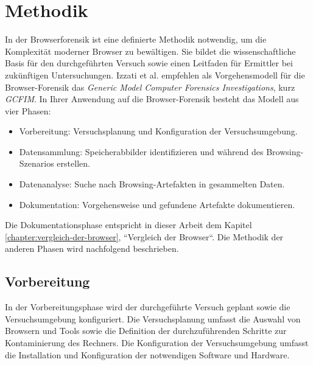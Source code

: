 \chapter{Methodik}
\label{chapter:methodik}
In der Browserforensik ist eine definierte Methodik notwendig, um die Komplexität moderner Browser zu bewältigen. Sie bildet die wissenschaftliche Basis für den durchgeführten Versuch sowie einen Leitfaden für Ermittler bei zukünftigen Untersuchungen. \cite{Aggarwal.2010, Izzati.2022, Horsman.2019}	
Izzati et al. empfehlen als Vorgehensmodell für die Browser-Forensik das \textit{Generic Model Computer Forensics Investigations}, kurz \textit{GCFIM}. \cite{Yusoff.2011}
In Ihrer Anwendung auf die Browser-Forensik besteht das Modell aus vier Phasen: \cite{Izzati.2022}
\begin{itemize}
	\item Vorbereitung: Versuchsplanung und Konfiguration der Versuchsumgebung.
	\item Datensammlung: Speicherabbilder identifizieren und während des Browsing-Szenarios erstellen. 
	\item Datenanalyse: Suche nach Browsing-Artefakten in gesammelten Daten.
	\item Dokumentation: Vorgehensweise und gefundene Artefakte dokumentieren.
\end{itemize}

Die Dokumentationsphase entspricht in dieser Arbeit dem Kapitel \ref{chapter:vergleich-der-browser}, ``Vergleich der Browser``. Die Methodik der anderen Phasen wird nachfolgend beschrieben.

\section{Vorbereitung}
\label{section:methodik-vorbereitung}
In der Vorbereitungsphase wird der durchgeführte Versuch geplant sowie die Versuchsumgebung konfiguriert. \cite{Izzati.2022} Die Versuchsplanung umfasst die Auswahl von Browsern und Tools sowie die Definition der durchzuführenden Schritte zur Kontaminierung des Rechners. Die Konfiguration der Versuchsumgebung umfasst die Installation und Konfiguration der notwendigen Software und Hardware.

